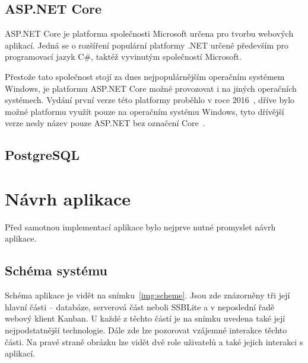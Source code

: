 \section{ASP.NET Core}
ASP.NET Core je platforma společnosti Microsoft určena pro tvorbu webových aplikací. Jedná se o rozšíření populární platformy .NET určené především pro programovací jazyk C\#, taktéž vyvinutým společností Microsoft.

Přestože tato společnost stojí za dnes nejpopulárnějším operačním systémem Windows, je platformu ASP.NET Core možné provozovat i na jiných operačních systémech. Vydání první verze této platformy proběhlo v roce 2016~\cite{bib:asp-release}, dříve bylo možné platformu využít pouze na operačním systému Windows, tyto dřívější verze nesly název pouze ASP.NET bez označení Core~\cite{bib:asp-what-is}.

\blindtext

\section{PostgreSQL}
\blindtext



\chapter{Návrh aplikace}
Před samotnou implementací aplikace bylo nejprve nutné promyslet návrh aplikace. 
\blindtext


\section{Schéma systému}
Schéma aplikace je vidět na snímku~\ref{img:scheme}. Jsou zde znázorněny tři její hlavní části -- databáze, serverová část neboli SSBLite a v neposlední řadě webový klient Kanban. U každé z těchto částí je na snímku uvedena také její nejpodstatnější technologie. Dále zde lze pozorovat vzájemné interakce těchto části. Na pravé straně obrázku lze vidět dvě role uživatelů a také jejich interakci s aplikací.

